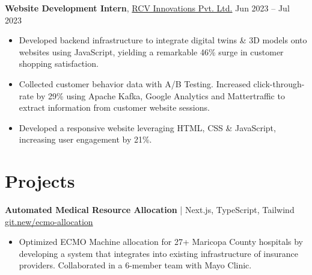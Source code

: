 \documentclass[11pt]{article}       %
\begin{document}
\textbf{Website Development Intern}, \href{https://www.rcvinnovations.com/}{RCV Innovations Pvt. Ltd.} \hfill Jun 2023 -- Jul 2023 \\
\vspace{-5pt}
\begin{itemize}
\item Developed backend infrastructure to integrate digital twins \& 3D models onto websites using JavaScript, yielding a remarkable 46\% surge in customer shopping satisfaction. 
\item Collected customer behavior data with A/B Testing. Increased click-through-rate by 29\% using Apache Kafka, Google Analytics and Mattertraffic to extract information from customer website sessions.
\item Developed a responsive website leveraging HTML, CSS \& JavaScript, increasing user engagement by 21\%. 
\end{itemize}


\vspace{-15.5pt}

\section*{Projects}



\textbf{Automated Medical Resource Allocation} | Next.js, TypeScript, Tailwind \hfill \href{https://git.new/ecmo-allocation}{\color{blue} git.new/ecmo-allocation} \\
\vspace{-6pt}
\begin{itemize}
\item Optimized ECMO Machine allocation for 27+ Maricopa County hospitals by developing a system that integrates into existing infrastructure of insurance providers. Collaborated in a 6-member team with Mayo Clinic.
\end{itemize}
\end{document}
